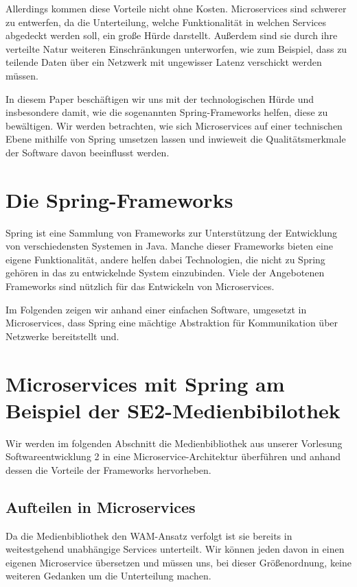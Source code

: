 \documentclass{article}
\begin{document}
Allerdings kommen diese Vorteile nicht ohne Kosten.
Microservices sind schwerer zu entwerfen, da die Unterteilung, welche Funktionalität in welchen Services abgedeckt werden soll, ein große Hürde darstellt. \cite{SCASASD}
Außerdem sind sie durch ihre verteilte Natur weiteren Einschränkungen unterworfen, wie zum Beispiel, dass zu teilende Daten über ein Netzwerk mit ungewisser Latenz verschickt werden müssen. \cite{MATT}

In diesem Paper beschäftigen wir uns mit der technologischen Hürde und insbesondere damit, wie die sogenannten Spring-Frameworks helfen, diese zu bewältigen.
Wir werden betrachten, wie sich Microservices auf einer technischen Ebene mithilfe von Spring umsetzen lassen und inwieweit die Qualitätsmerkmale der Software davon beeinflusst werden.

\section{Die Spring-Frameworks}

Spring ist eine Sammlung von Frameworks zur Unterstützung der Entwicklung von verschiedensten Systemen in Java.
Manche dieser Frameworks bieten eine eigene Funktionalität, andere helfen dabei Technologien, die nicht zu Spring gehören in das zu entwickelnde System einzubinden.
Viele der Angebotenen Frameworks sind nützlich für das Entwickeln von Microservices.

Im Folgenden zeigen wir anhand einer einfachen Software, umgesetzt in Microservices, dass Spring eine mächtige Abstraktion für Kommunikation über Netzwerke bereitstellt und.

\section{Microservices mit Spring am Beispiel der SE2-Medienbibilothek}

Wir werden im folgenden Abschnitt die Medienbibliothek aus unserer Vorlesung Softwareentwicklung 2 in eine Microservice-Architektur überführen und anhand dessen die Vorteile der Frameworks hervorheben.

\subsection{Aufteilen in Microservices}

Da die Medienbibliothek den WAM-Ansatz verfolgt ist sie bereits in weitestgehend unabhängige Services unterteilt.
Wir können jeden davon in einen eigenen Microservice übersetzen und müssen uns, bei dieser Größenordnung, keine weiteren Gedanken um die Unterteilung machen.
\end{document}
